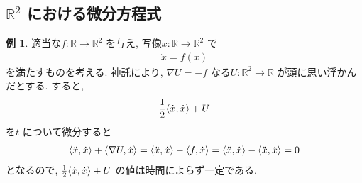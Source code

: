 \documentclass[10pt, fleqn, label-section=none]{bxjsarticle}
\theoremstyle{definition}
\newtheorem{ex}[dfn]{例}
\newcommand{\tbra}[1]{\mleft\langle#1\mright\rangle}
\renewcommand{\;}{\, ; \,}
\begin{document}
\subsection{$\mathbb R^2$ における微分方程式}

\begin{ex}適当な$f: \mathbb R \rightarrow \mathbb R^2$ を与え, 写像$x: \mathbb R \rightarrow \mathbb R^2$ で
\begin{align*} \ddot x = f(x)  \end{align*}
を満たすものを考える. 神託により, $\nabla U = - f$ なる$U : \mathbb R^2 \rightarrow \mathbb R$ が頭に思い浮かんだとする. すると,
\begin{align*} \frac{1}{2} \tbra{\dot x, \dot x} + U \end{align*}
を$t$ について微分すると
\begin{align*} \tbra{\ddot x, \dot x} + \tbra{\nabla U, \dot x} = \tbra{\ddot x, \dot x} -  \tbra{ f, \dot x} =  \tbra{\ddot x, \dot x} -  \tbra{ \ddot x , \dot x} = 0 \end{align*}
となるので, $\frac{1}{2} \tbra{\dot x, \dot x} + U $ の値は時間によらず一定である. 
\end{ex}
\end{document}
